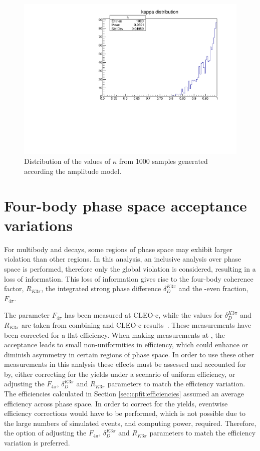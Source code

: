 \begin{figure}[h]
\centering
\includegraphics[trim = 0mm 0mm 0mm 8mm, clip, width=0.5\linewidth]{figures/results/kappa.pdf}
\caption{Distribution of the values of $\kappa$ from 1000 samples generated according the amplitude model.}
\label{kappadistribution}
\end{figure}

\section{Four-body phase space acceptance variations}
\label{sec:interpretation:inputs}

For multibody \decay{\Dz}{\Kmp\pipm\pimp\pipm} and \decay{\Dz}{\pip\pim\pip\pim} decays, some regions of phase space may exhibit larger \CP violation than other regions. In this analysis, an inclusive analysis over phase space is performed, therefore only the global \CP violation is considered, resulting in a loss of information. This loss of information gives rise to the four-body coherence factor, $R_{K3\pi}$, the integrated strong phase difference $\delta_D^{K3\pi}$ and the \CP-even fraction, $F_{4\pi}$.

The parameter $F_{4\pi}$ has been measured at CLEO-c, while the values for $\delta_D^{K3\pi}$ and $R_{K3\pi}$ are taken from combining \lhcb and CLEO-c results~\cite{charmk3pi,charmk3pi_errata,LHCb-PAPER-2015-057,charm4pi}. These measurements have been corrected for a flat efficiency. When making measurements at \lhcb, the \lhcb acceptance leads to small non-uniformities in efficiency, which could enhance or diminish asymmetry in certain regions of phase space. In order to use these other measurements in this analysis these effects must be assessed and accounted for by, either correcting for the \lhcb yields under a scenario of uniform efficiency, or adjusting the $F_{4\pi}$, $\delta_D^{K3\pi}$ and $R_{K3\pi}$ parameters to match the \lhcb efficiency variation. The efficiencies calculated in Section \ref{sec:cpfit:efficiencies} assumed an average efficiency across phase space. In order to correct for the \lhcb yields, eventwise efficiency corrections would have to be performed, which is not possible due to the large numbers of simulated events, and computing power, required. Therefore, the option of adjusting the $F_{4\pi}$, $\delta_D^{K3\pi}$ and $R_{K3\pi}$ parameters to match the \lhcb efficiency variation is preferred.

